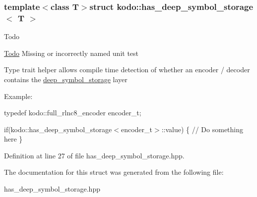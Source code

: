 \subsubsection*{template$<$class T$>$struct kodo\-::has\-\_\-deep\-\_\-symbol\-\_\-storage$<$ T $>$}

\begin{DoxyRefDesc}{Todo}
\item[\hyperlink{todo__todo000020}{Todo}]Missing or incorrectly named unit test

Type trait helper allows compile time detection of whether an encoder / decoder contains the \hyperlink{classkodo_1_1deep__symbol__storage}{deep\-\_\-symbol\-\_\-storage} layer\end{DoxyRefDesc}


Example\-:

typedef kodo\-::full\-\_\-rlnc8\-\_\-encoder encoder\-\_\-t;

if(kodo\-::has\-\_\-deep\-\_\-symbol\-\_\-storage$<$encoder\-\_\-t$>$\-::value) \{ // Do something here \} 

Definition at line 27 of file has\-\_\-deep\-\_\-symbol\-\_\-storage.\-hpp.



The documentation for this struct was generated from the following file\-:\begin{DoxyCompactItemize}
\item 
has\-\_\-deep\-\_\-symbol\-\_\-storage.\-hpp\end{DoxyCompactItemize}
